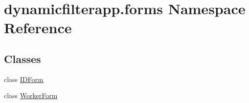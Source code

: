 \hypertarget{namespacedynamicfilterapp_1_1forms}{}\section{dynamicfilterapp.\+forms Namespace Reference}
\label{namespacedynamicfilterapp_1_1forms}
\subsection*{Classes}
\begin{DoxyCompactItemize}
\item 
class \hyperlink{classdynamicfilterapp_1_1forms_1_1_i_d_form}{I\+D\+Form}
\item 
class \hyperlink{classdynamicfilterapp_1_1forms_1_1_worker_form}{Worker\+Form}
\end{DoxyCompactItemize}
